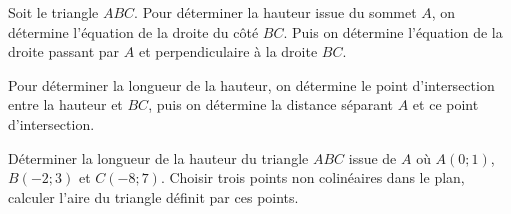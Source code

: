 \documentclass[a4paper,12pt]{report}
\begin{document}
\begin{rem}
Soit le triangle $ABC$. Pour déterminer la hauteur issue du sommet $A$, on détermine l'équation de la droite du côté $BC$. Puis on détermine l'équation de la droite passant par $A$ et perpendiculaire à la droite $BC$.

Pour déterminer la longueur de la hauteur, on détermine le point d'intersection entre la hauteur et $BC$, puis on détermine la distance séparant $A$ et ce point d'intersection. 
\end{rem}
   \begin{boiteExT}
    \vspace{14cm}
       
   \end{boiteExT}
\medskip
   \begin{exo}
       \begin{tasks}
        \task Déterminer la longueur de la hauteur du triangle $ABC$ issue de $A$ où $A(0;1)$, $B(-2;3)$ et $C(-8;7)$.
        \task Choisir trois points non colinéaires dans le plan, calculer l'aire du triangle définit par ces points. 
       \end{tasks}
   \end{exo}
\end{document}
